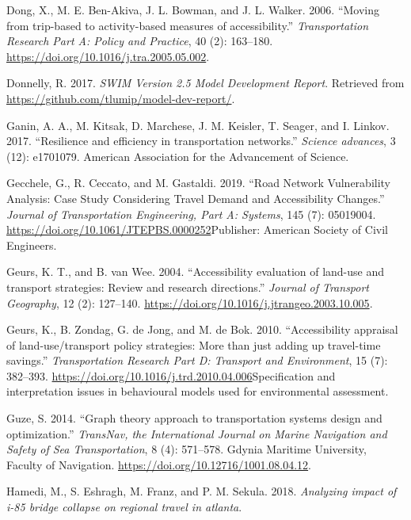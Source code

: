 \documentclass[]{ascelike-new}
\newlength{\cslhangindent}
\newenvironment{CSLReferences}[2] %
 {\begin{list}{}{%
  \setlength{\itemindent}{0pt}
  \setlength{\leftmargin}{0pt}
  \setlength{\parsep}{0pt}
  \ifodd #1
   \setlength{\leftmargin}{\cslhangindent}
   \setlength{\itemindent}{-1\cslhangindent}
  \fi
  \setlength{\itemsep}{#2\baselineskip}}}
 {\end{list}}
\begin{document}
\begin{CSLReferences}{1}{0}
Dong, X., M. E. Ben-Akiva, J. L. Bowman, and J. L. Walker. 2006.
{``Moving from trip-based to activity-based measures of
accessibility.''} \emph{Transportation Research Part A: Policy and
Practice}, 40 (2): 163--180.
\url{https://doi.org/10.1016/j.tra.2005.05.002}.

Donnelly, R. 2017. \emph{{SWIM Version 2.5 Model Development Report}}.
Retrieved from \url{https://github.com/tlumip/model-dev-report/}.

Ganin, A. A., M. Kitsak, D. Marchese, J. M. Keisler, T. Seager, and I.
Linkov. 2017. {``Resilience and efficiency in transportation
networks.''} \emph{Science advances}, 3 (12): e1701079. American
Association for the Advancement of Science.

Gecchele, G., R. Ceccato, and M. Gastaldi. 2019. {``Road Network
Vulnerability Analysis: Case Study Considering Travel Demand and
Accessibility Changes.''} \emph{Journal of Transportation Engineering,
Part A: Systems}, 145 (7): 05019004.
\url{https://doi.org/10.1061/JTEPBS.0000252}Publisher: American Society
of Civil Engineers.

Geurs, K. T., and B. van Wee. 2004. {``Accessibility evaluation of
land-use and transport strategies: Review and research directions.''}
\emph{Journal of Transport Geography}, 12 (2): 127--140.
\url{https://doi.org/10.1016/j.jtrangeo.2003.10.005}.

Geurs, K., B. Zondag, G. de Jong, and M. de Bok. 2010. {``Accessibility
appraisal of land-use/transport policy strategies: More than just adding
up travel-time savings.''} \emph{Transportation Research Part D:
Transport and Environment}, 15 (7): 382--393.
\url{https://doi.org/10.1016/j.trd.2010.04.006}Specification and
interpretation issues in behavioural models used for environmental
assessment.

Guze, S. 2014. {``Graph theory approach to transportation systems design
and optimization.''} \emph{TransNav, the International Journal on Marine
Navigation and Safety of Sea Transportation}, 8 (4): 571--578. Gdynia
Maritime University, Faculty of Navigation.
\url{https://doi.org/10.12716/1001.08.04.12}.

Hamedi, M., S. Eshragh, M. Franz, and P. M. Sekula. 2018.
\emph{Analyzing impact of i-85 bridge collapse on regional travel in
atlanta}.


\end{CSLReferences}
\end{document}
